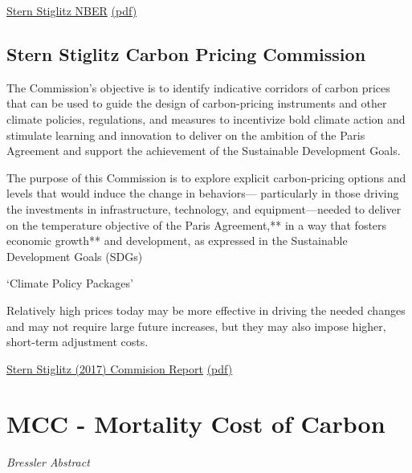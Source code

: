 \documentclass[
]{book}
\begin{document}
\href{https://www.nber.org/papers/w28472}{Stern Stiglitz NBER}
\href{pdf/Stern_Stiglitz_2021_SCC_Alternative_w28472.pdf}{(pdf)}

\hypertarget{stern-stiglitz-carbon-pricing-commission}{%
\subsection{Stern Stiglitz Carbon Pricing Commission}\label{stern-stiglitz-carbon-pricing-commission}}

The Commission's objective is to identify indicative corridors of carbon prices that can
be used to guide the design of carbon-pricing instruments and other climate policies,
regulations, and measures to incentivize bold climate action and stimulate learning and
innovation to deliver on the ambition of the Paris Agreement and support the achievement
of the Sustainable Development Goals.

The purpose of this Commission is to explore explicit carbon-pricing
options and levels that would induce the change in behaviors---
particularly in those driving the investments in infrastructure,
technology, and equipment---needed to deliver on the temperature
objective of the Paris Agreement,** in a way that fosters economic
growth** and development, as expressed in the Sustainable
Development Goals (SDGs)

`Climate Policy Packages'

Relatively high prices today may be more effective in driving the needed changes
and may not require large future increases,
but they may also impose higher, short-term adjustment costs.

\href{https://www.carbonpricingleadership.org/report-of-the-highlevel-commission-on-carbon-prices}{Stern Stiglitz (2017) Commision Report}
\href{pdf/Stern_Stiglitz_2017_Commision_Report.pdf}{(pdf)}

\hypertarget{mcc---mortality-cost-of-carbon}{%
\section{MCC - Mortality Cost of Carbon}\label{mcc---mortality-cost-of-carbon}}

\emph{Bressler Abstract}
\end{document}
